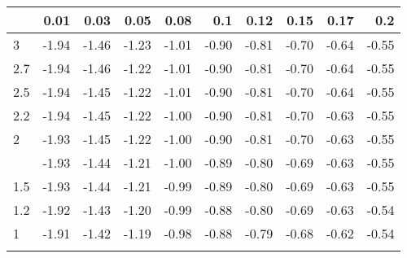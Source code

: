 
\begin{tabular}{lrrrrrrrrr}
\toprule{}
  & 0.01 & 0.03 & 0.05 & 0.08 & 0.1 & 0.12 & 0.15 & 0.17 & 0.2\\
\midrule{}
3 & -1.94 & -1.46 & -1.23 & -1.01 & -0.90 & -0.81 & -0.70 & -0.64 & -0.55\\
2.7 & -1.94 & -1.46 & -1.22 & -1.01 & -0.90 & -0.81 & -0.70 & -0.64 & -0.55\\
2.5 & -1.94 & -1.45 & -1.22 & -1.01 & -0.90 & -0.81 & -0.70 & -0.64 & -0.55\\
2.2 & -1.94 & -1.45 & -1.22 & -1.00 & -0.90 & -0.81 & -0.70 & -0.63 & -0.55\\
2 & -1.93 & -1.45 & -1.22 & -1.00 & -0.90 & -0.81 & -0.70 & -0.63 & -0.55\\
\addlinespace
1.7 & -1.93 & -1.44 & -1.21 & -1.00 & -0.89 & -0.80 & -0.69 & -0.63 & -0.55\\
1.5 & -1.93 & -1.44 & -1.21 & -0.99 & -0.89 & -0.80 & -0.69 & -0.63 & -0.55\\
1.2 & -1.92 & -1.43 & -1.20 & -0.99 & -0.88 & -0.80 & -0.69 & -0.63 & -0.54\\
1 & -1.91 & -1.42 & -1.19 & -0.98 & -0.88 & -0.79 & -0.68 & -0.62 & -0.54\\
\bottomrule{}
\end{tabular}
